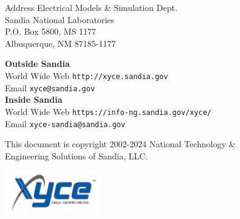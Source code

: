\begin{flushright}
Address \hfill Electrical Models \& Simulation Dept.\\
     Sandia National Laboratories\\
     P.O. Box 5800, MS 1177\\
     Albuquerque, NM 87185-1177 \\
\end{flushright}

\noindent
\textbf{Outside Sandia}\\
World Wide Web \hfill 
  \texttt{\color{XyceDeepRed}http://xyce.sandia.gov}
\\
Email \hfill
  \texttt{\color{XyceDeepRed}xyce@sandia.gov}
\\

\noindent
\textbf{Inside Sandia}\\
World Wide Web \hfill 
  \texttt{\color{XyceDeepRed}https://info-ng.sandia.gov/xyce/}
\\
Email \hfill
  \texttt{\color{XyceDeepRed}xyce-sandia@sandia.gov}

\vfill
\noindent
\parbox{\textwidth}{
     \parbox{4.1in}{\small This document is copyright \textcopyright{}
     2002-2024 National Technology \&\\Engineering Solutions of Sandia, LLC.}
     \hfill
     \includegraphics[height=0.75in]{xyce_flat_white}
}

